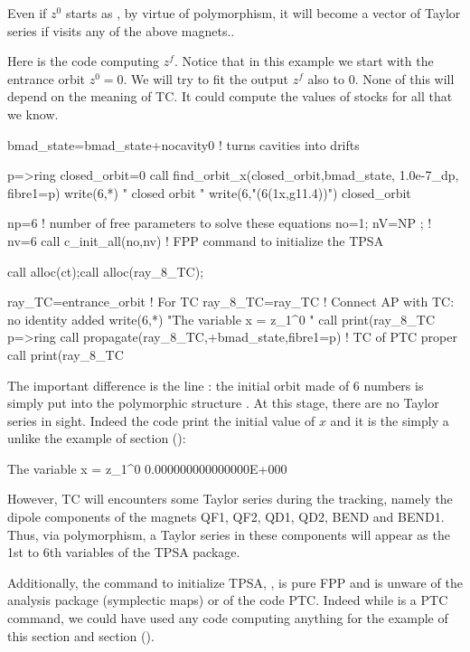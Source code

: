 \documentclass{hitec}     %
\begin{document}
{{{{{{Even if  $z^0$ starts as , by virtue of polymorphism, it  will become a vector of Taylor series if  visits any of the above magnets.. 

Here is the code computing $z^f$. Notice that in this example we start with the entrance orbit $z^0=0$.  We will try to fit the output $z^f$ also to $0$. None of this will depend on the meaning of TC. It could compute the values of stocks for all that we know.



\begin{code}
bmad_state=bmad_state+nocavity0 ! turns cavities into drifts

p=>ring%
closed_orbit=0
call find_orbit_x(closed_orbit,bmad_state, 1.0e-7_dp, fibre1=p)
write(6,*) " closed orbit "
write(6,"(6(1x,g11.4))") closed_orbit
 
np=6     ! number of free parameters to solve these equations
no=1; nV=NP ;  ! nv=6 
call c_init_all(no,nv)   ! FPP command to initialize the TPSA
  
call alloc(ct);call alloc(ray_8_TC);
 
ray_TC=entrance_orbit   !  For TC
ray_8_TC=ray_TC  ! Connect AP with TC: no identity added
write(6,*) "The variable x = z_1^0 "
call print(ray_8_TC%
p=>ring%
call propagate(ray_8_TC,+bmad_state,fibre1=p) !  TC of PTC proper
call print(ray_8_TC%
\end{code}
\renewcommand{\codefont}{\small}
 

The important difference is the line : the initial  orbit made of 6  numbers  is simply put into the polymorphic  structure .  At this stage, there are no Taylor series in sight. Indeed the code print the initial value of $x$ and it is the simply a  unlike the example of section   ():

\begin{code}
 The variable x = z_1^0
  0.000000000000000E+000
\end{code}


However,  TC will encounters some Taylor series during the tracking, namely the dipole components of the magnets QF1,  QF2, QD1, QD2, BEND and BEND1. Thus, via polymorphism, a Taylor series in these components will appear as the 1st to  6th variables of the TPSA package. 

Additionally, the command to initialize TPSA,  ,  is pure FPP and is unware of the analysis package (symplectic maps) or of the code PTC. Indeed while  is a PTC command, we could have used any code computing anything for the example of this section and   section ().

}}}}}}
\end{document}
